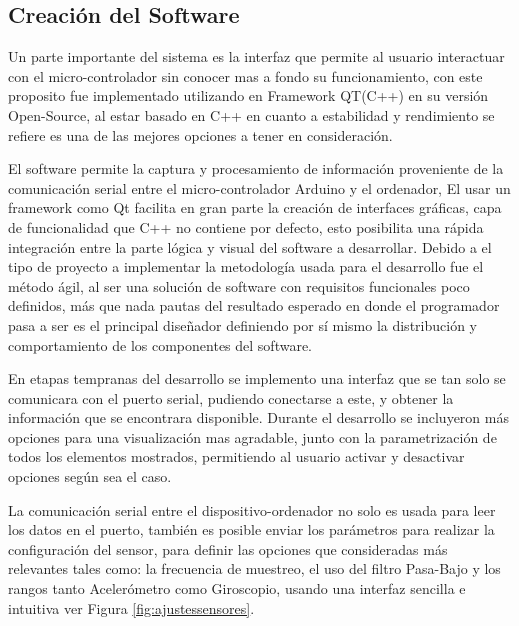 \documentclass[12pt,a4paper]{article}
\begin{document}
\subsection{Creación del Software}
Un parte importante del sistema es la interfaz que permite al usuario interactuar con el micro-controlador sin conocer mas a fondo su funcionamiento,
con este proposito fue implementado utilizando en Framework QT(C++)\cite{QT} en su versión Open-Source, al estar basado en C++ en cuanto a estabilidad y rendimiento se refiere es una de las mejores opciones a tener en consideración.

El software permite la captura y procesamiento de información proveniente de la comunicación serial entre el micro-controlador Arduino y el ordenador,
El usar un framework como Qt facilita en gran parte la creación de interfaces gráficas, capa de funcionalidad que C++ no contiene por defecto, esto posibilita una rápida integración entre la parte lógica y visual del software a desarrollar.
Debido a el tipo de proyecto a implementar la metodología usada para el desarrollo fue el método ágil, al ser una solución de software con requisitos funcionales poco definidos, más que nada pautas del resultado esperado en donde el programador pasa a ser es el principal diseñador definiendo por sí mismo la distribución y comportamiento de los componentes del software.

En etapas tempranas del desarrollo se implemento una interfaz que se tan solo se comunicara con el puerto serial, pudiendo conectarse a este, y obtener la información que se encontrara disponible.
Durante el desarrollo se incluyeron más opciones para una visualización mas agradable, junto con la parametrización de todos los elementos mostrados, permitiendo al usuario activar y desactivar opciones según sea el caso.

La comunicación serial entre el dispositivo-ordenador no solo es usada para leer los datos en el puerto, también es posible enviar los parámetros para realizar la configuración del sensor, para definir las opciones que consideradas más relevantes tales como: la frecuencia de muestreo, el uso del filtro Pasa-Bajo y los rangos tanto Acelerómetro como Giroscopio, usando una interfaz sencilla e intuitiva ver Figura \ref{fig:ajustessensores}.
\end{document}
